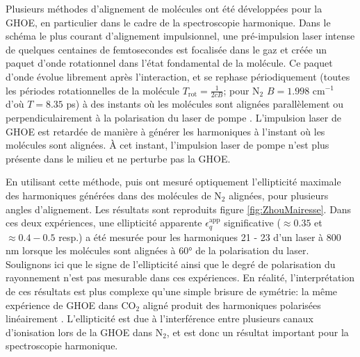 Plusieurs méthodes d'alignement de molécules ont été développées pour la GHOE, en particulier dans le cadre de la spectroscopie harmonique. Dans le schéma le plus courant d'alignement impulsionnel, une pré-impulsion laser intense de quelques centaines de femtosecondes est focalisée dans le gaz et créée un paquet d'onde rotationnel dans l'état fondamental de la molécule. Ce paquet d'onde évolue librement après l'interaction, et se rephase périodiquement (toutes les périodes rotationnelles de la molécule $T_{\text{rot}} = \frac{1}{2cB}$; pour N$_2$ $B = 1.998$ cm$^{-1}$ d'où $T = 8.35$ ps) à des instants où les molécules sont alignées parallèlement ou perpendiculairement à la polarisation du laser de pompe . L'impulsion laser de GHOE est retardée de manière à générer les harmoniques à l'instant où les molécules sont alignées. \`{A} cet instant, l'impulsion laser de pompe n'est plus présente dans le milieu et ne perturbe pas la GHOE.

En utilisant cette méthode,  puis  ont mesuré optiquement l'ellipticité maximale des harmoniques générées dans des molécules de N$_2$ alignées, pour plusieurs angles d'alignement. Les résultats sont reproduits figure \ref{fig:ZhouMairesse}. Dans ces deux expériences, une ellipticité apparente $\epsilon_q^{\text{app}}$ significative ($\approx 0.35$ et $\approx 0.4 - 0.5$ resp.) a été mesurée pour les harmoniques 21 - 23 d'un laser à 800 nm lorsque les molécules sont alignées à 60° de la polarisation du laser. Soulignons ici que le signe de l'ellipticité ainsi que le degré de polarisation du rayonnement n'est pas mesurable dans ces expériences. En réalité, l'interprétation de ces résultats est plus complexe qu'une simple brisure de symétrie: la même expérience de GHOE dans CO$_2$ aligné produit des harmoniques polarisées linéairement . L'ellipticité est due à l'interférence entre plusieurs canaux d'ionisation lors de la GHOE dans N$_2$, et est donc un résultat important pour la spectroscopie harmonique.

